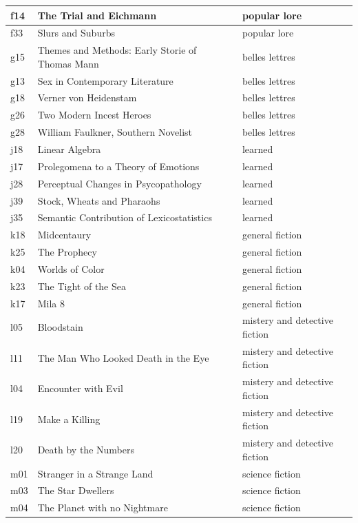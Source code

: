 \documentclass[12pt,letterpaper,twoside]{article}
\begin{document}
\begin{longtable}{| p{} | p{} | p{}|}
        f14 & The Trial and Eichmann & popular lore  \\ \hline
        f33 & Slurs and Suburbs & popular lore  \\ \hline
        g15 & Themes and Methods: Early Storie of Thomas Mann & belles lettres  \\ \hline
        g13 & Sex in Contemporary Literature & belles lettres  \\ \hline
        g18 & Verner von Heidenstam & belles lettres  \\ \hline
        g26 & Two Modern Incest Heroes & belles lettres  \\ \hline
        g28 & William Faulkner, Southern Novelist & belles lettres \\ \hline
        j18 & Linear Algebra & learned  \\ \hline
        j17 & Prolegomena to a Theory of Emotions & learned  \\ \hline
        j28 & Perceptual Changes in Psycopathology & learned  \\ \hline
        j39 & Stock, Wheats and Pharaohs & learned \\ \hline
        j35 & Semantic Contribution of Lexicostatistics & learned  \\ \hline
        k18 & Midcentaury & general fiction  \\ \hline
        k25 & The Prophecy & general fiction  \\ \hline
        k04 & Worlds of Color & general fiction  \\ \hline
        k23 & The Tight of the Sea & general fiction  \\ \hline
        k17 & Mila 8 & general fiction  \\ \hline
        l05 & Bloodstain & mistery and detective fiction  \\ \hline
        l11 & The Man Who Looked Death in the Eye & mistery and detective fiction  \\ \hline
        l04 & Encounter with Evil & mistery and detective fiction  \\ \hline
        l19 & Make a Killing & mistery and detective fiction  \\ \hline
        l20 & Death by the Numbers & mistery and detective fiction  \\ \hline
        m01 & Stranger in a Strange Land & science fiction  \\ \hline
        m03 & The Star Dwellers & science fiction  \\ \hline
        m04 & The Planet with no Nightmare & science fiction  \\ \hline

\end{longtable}
\end{document}
